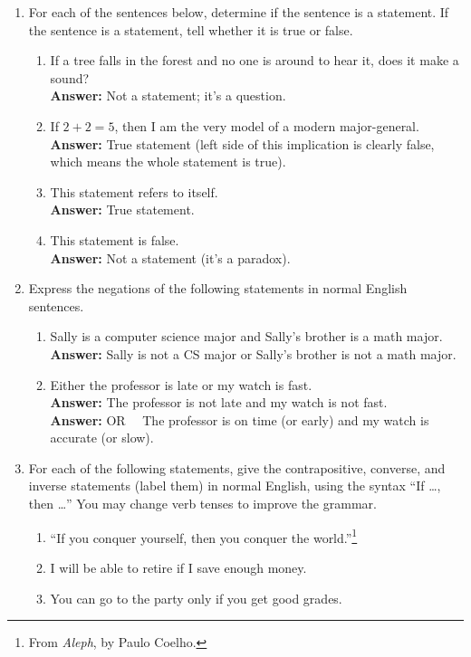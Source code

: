 \documentclass[12pt, letterpaper]{report}
\newcommand{\ans}{\textbf{Answer: }}
\begin{document}
\begin{enumerate}
	\item For each of the sentences below, determine if the sentence is a statement.  If
	the sentence is a statement, tell whether it is true or false.
	\begin{enumerate}
		\item If a tree falls in the forest and no one is around to hear it, does it make a sound?
		\\ \ans Not a statement; it's a question.
		\item If $2+2=5$, then I am the very model of a modern major-general.
		\\ \ans True statement (left side of this implication is clearly false, which means the whole statement is true).
		\item This statement refers to itself.
		\\ \ans True statement.
		\item This statement is false.
		\\ \ans Not a statement (it's a paradox).
	\end{enumerate}
	
	\item Express the negations of the following statements in normal English sentences.
	\begin{enumerate}
		\item Sally is a computer science major and Sally's brother is a math major.
		\\ \ans Sally is not a CS major or Sally's brother is not a math major.
		\item Either the professor is late or my watch is fast.
		\\ \ans The professor is not late and my watch is not fast.
		\\ \ans OR \ \ The professor is on time (or early) and my watch is accurate (or slow).
	\end{enumerate}
	
	\item For each of the following statements, give the contrapositive, converse, and
	inverse statements (label them) in normal English, using the syntax ``If \ldots, then \ldots''  
	You may change verb tenses to improve
	the grammar.
	\begin{enumerate}
		\item ``If you conquer yourself, then you conquer the world.''\footnote{From \emph{Aleph}, by Paulo Coelho.}			
		\item I will be able to retire if I save enough money.
		\item You can go to the party only if you get good grades.


\end{enumerate}
\end{enumerate}
\end{document}

